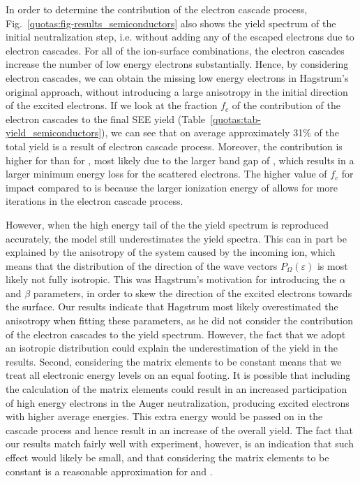 \begin{refsection}
In order to determine the contribution of the electron cascade process, Fig.~\ref{quotas:fig-results_semiconductors} also shows the yield spectrum of the initial neutralization step, i.e. without adding any of the escaped electrons due to electron cascades. For all of the ion-surface combinations, the electron cascades increase the number of low energy electrons substantially. Hence, by considering electron cascades, we can obtain the missing low energy electrons in Hagstrum's original approach, without introducing a large anisotropy in the initial direction of the excited electrons. If we look at the fraction $f_c$ of the contribution of the electron cascades to the final SEE yield (Table~\ref{quotas:tab-yield_semiconductors}), we can see that on average approximately 31\% of the total yield is a result of electron cascade process. Moreover, the contribution is higher for  than for , most likely due to the larger band gap of , which results in a larger minimum energy loss for the scattered electrons. The higher value of $f_c$ for  impact compared to  is because the larger ionization energy of  allows for more iterations in the electron cascade process.

However, when the high energy tail of the the yield spectrum is reproduced accurately, the model still underestimates the yield spectra. This can in part be explained by the anisotropy of the system caused by the incoming ion, which means that the distribution of the direction of the wave vectors $P_\Omega(\varepsilon)$ is most likely not fully isotropic. This was Hagstrum's motivation for introducing the $\alpha$ and $\beta$ parameters, in order to skew the direction of the excited electrons towards the surface. Our results indicate that Hagstrum most likely overestimated the anisotropy when fitting these parameters, as he did not consider the contribution of the electron cascades to the yield spectrum. However, the fact that we adopt an isotropic distribution could explain the underestimation of the yield in the results. Second, considering the matrix elements to be constant means that we treat all electronic energy levels on an equal footing. It is possible that including the calculation of the matrix elements could result in an increased participation of high energy electrons in the Auger neutralization, producing excited electrons with higher average energies. This extra energy would be passed on in the cascade process and hence result in an increase of the overall yield. The fact that our results match fairly well with experiment, however, is an indication that such effect would likely be small, and that considering the matrix elements to be constant is a reasonable approximation for  and .


\end{refsection}
